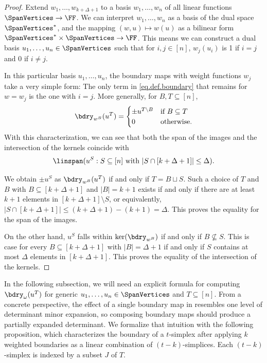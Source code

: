 \begin{proof}
    Extend $w_1,\dots,w_{k+\Delta+1}$ to a basis $w_1,\dots,w_n$ of all linear functions $\SpanVertices\to \FF$. We can interpret $w_1,\dots,w_n$ as a basis of the dual space $\SpanVertices^*$, and the mapping $(w,u) \mapsto w(u)$ as a bilinear form $\SpanVertices^*\times \SpanVertices\to\FF$. This means we can construct a dual basis $u_1,\dots,u_n\in \SpanVertices$ such that for $i,j\in [n]$, $w_j(u_i)$ is 1 if $i=j$ and 0 if $i\neq j$.

    In this particular basis $u_1,\dots,u_n$, the boundary maps with weight functions $w_j$ take a very simple form: The only term in \eqref{eq.def.boundary} that remains for $w=w_j$ is the one with $i=j$. More generally,  
    for $B, T \subseteq [n]$,
    \begin{equation}\label{eq.bdry.special} 
    \bdry_{w^B} (u^T) =
    \begin{cases}
        \pm u^{T \setminus B} & \text{if $B\subseteq T$}\\
        0 & \text{otherwise.}
    \end{cases}
    \end{equation}
    With this characterization, we can see that both the span of the images and the intersection of the kernels 
    coincide with
    \[\linspan(u^S: S \subseteq [n] \text{ with } |S \cap [k+\Delta+1]| \le \Delta). \]
    
    We obtain $\pm u^S$ as $\bdry_{w^B} (u^T)$ if and only if $T = B \sqcup S$. Such a choice of $T$ and $B$ with $B \subseteq [k+\Delta+1]$ and $|B|=k+1$ exists if and only if there are at least $k+1$ elements in $[k+\Delta+1] \setminus S$, or equivalently, $|S \cap [k+\Delta+1]| \le (k+\Delta+1)-(k+1) = \Delta$. This proves the equality for the span of the images.
    
    On the other hand, $u^S$ falls within $\ker(\bdry_{w^B})$ if and only if $B \not\subseteq S$. This is case for every $B \subseteq [k+\Delta+1]$ with $|B|=\Delta+1$ if and only if $S$ contains at most $\Delta$ elements in $[k+\Delta+1]$. This proves the equality of the intersection of the kernels.
\end{proof}

In the following subsection, we will need an explicit formula for computing $\bdry_{\omega}(u^T)$ for generic $u_1, \dots, u_n \in \SpanVertices$ and $T \subseteq [n]$. From a concrete perspective, the effect of a single boundary map in  resembles one level of determinant minor expansion, so composing boundary maps should produce a partially expanded determinant. We formalize that intuition with the following proposition, which characterizes the boundary of a $t$-simplex after applying $k$ weighted boundaries as a linear combination of $(t-k)$-simplices. Each $(t-k)$-simplex is indexed by a subset $J$ of $T$.

